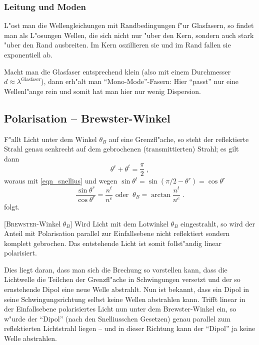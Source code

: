 \documentclass[twoside,a4paper]{book}
\newenvironment{Def}[1][]{%
\definecolor{shadethmcolor}{rgb}{.95,.95,.95}%
\definecolor{shaderulecolor}{rgb}{0.8,0.8,0.8}%
\setlength{\shadeboxrule}{1pt}%
\begin{Defi}[#1]%
 }{\end{Defi}}
\begin{document}
\subsubsection{Leitung und Moden}
\label{kap_leitung-und-moden}

L"ost man die Wellengleichungen mit Randbedingungen f"ur Glasfasern,
so findet man als L"osungen Wellen, die sich nicht nur "uber den Kern,
sondern auch stark "uber den Rand ausbreiten. Im Kern oszillieren sie
und im Rand fallen sie exponentiell ab.

Macht man die Glasfaser entsprechend klein (also mit einem Durchmesser
$d \approx \lambda^\text{Glasfaser}$), dann erh"alt man
"`Mono-Mode"'-Fasern: Hier "`passt"' nur eine Wellenl"ange rein und
somit hat man hier nur wenig Dispersion.








\subsection{Polarisation -- Brewster-Winkel}
\label{kap_polarisation-brewster}


F"allt Licht unter dem Winkel $\theta_B$ auf eine Grenzfl"ache, so
steht der reflektierte Strahl genau senkrecht auf dem gebrochenen
(transmittierten) Strahl; es gilt dann
\begin{equation*}
   \theta^r + \theta^t =\frac{\pi}{2}\;,
\end{equation*}
woraus mit \eqref{eqn_snellius} und wegen $\sin\theta^t = \sin(\pi/2 -
\theta^r) = \cos \theta^r$
\begin{equation}
   \label{eq:50}
   \frac{\sin \theta^r}{\cos \theta^r} = \frac{n^t}{n^e} \text{ oder }
   ~ 
\theta_B = \arctan \frac{n^t}{n^e} \;.
\end{equation}
folgt.

\begin{Def}
   [\textsc{Brewster}-Winkel $\theta_B$]
Wird Licht mit dem Lotwinkel $\theta_B$ eingestrahlt, so wird der Anteil
mit Polarisation parallel zur Einfallsebene nicht reflektiert sondern
komplett gebrochen. Das entstehende Licht ist somit follst"andig
linear polarisiert.
\end{Def}

Dies liegt daran, dass man sich die Brechung so vorstellen kann, dass
die Lichtwelle die Teilchen der Grenzfl"ache in Schwingungen versetzt
und der so ernstehende Dipol eine neue Welle abstrahlt. Nun ist
bekannt, dass ein Dipol in seine Schwingungsrichtung selbst keine
Wellen abstrahlen kann. Trifft linear in der Einfallsebene
polarisiertes Licht nun unter dem Brewster-Winkel ein, so w"urde der
"`Dipol"' (nach den Snelliusschen Gesetzen) genau parallel zum
reflektierten Lichtstrahl liegen -- und in dieser Richtung kann der
"`Dipol"' ja keine Welle abstrahlen.
\end{document}
